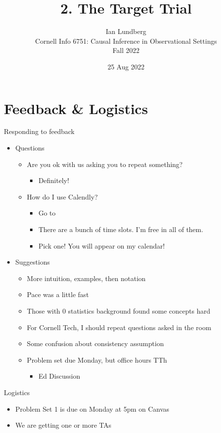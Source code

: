 \documentclass{beamer}
\title{2. The Target Trial}
\author{Ian Lundberg\\Cornell Info 6751: Causal Inference in Observational Settings\\Fall 2022}
\date{25 Aug 2022}
\newcommand\bref[2]{\href{#1}{\color{blue}{#2}}}
\begin{document}
\maketitle

\section{Feedback \& Logistics}

\begin{frame}{Responding to feedback}
\begin{itemize}[<+->]
\item Questions
\begin{itemize}
\item Are you ok with us asking you to repeat something?
\begin{itemize}
\item Definitely!
\end{itemize}
\item How do I use Calendly?
\begin{itemize}
\item Go to \bref{https://calendly.com/ianlundberg/office-hours}{calendly.com/ianlundberg/office-hours}
\item There are a bunch of time slots. I'm free in all of them.
\item Pick one! You will appear on my calendar!
\end{itemize}
\end{itemize}
\item Suggestions
\begin{itemize}
\item More intuition, examples, then notation
\item Pace was a little fast
\item Those with 0 statistics background found some concepts hard
\item For Cornell Tech, I should repeat questions asked in the room
\item Some confusion about consistency assumption
\item Problem set due Monday, but office hours TTh
\begin{itemize}
\item Ed Discussion
\end{itemize}
\end{itemize}
\end{itemize}
\end{frame}

\begin{frame}{Logistics}
\begin{itemize}
\item Problem Set 1 is due on Monday at 5pm on Canvas
\item We are getting one or more TAs
\end{itemize}
\end{frame}
\end{document}
